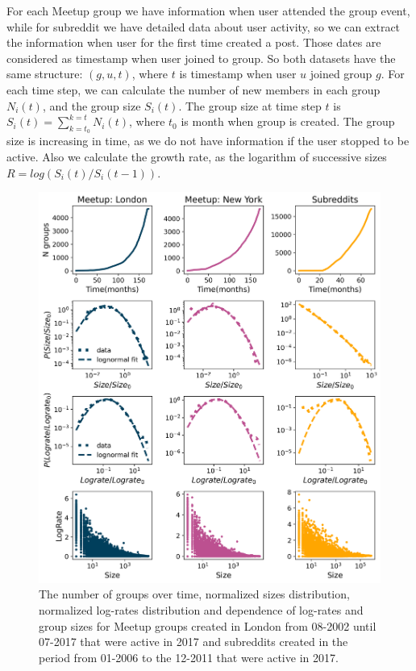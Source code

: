 For each Meetup group we have information when user attended the group event, while for subreddit we have detailed data about user activity, so we can extract the information when user for the first time created a post. Those dates are considered as timestamp when user joined to group. So both datasets have the same structure: $(g, u, t)$, where $t$ is timestamp when user $u$ joined group $g$. For each time step, we can calculate the number of new members in each group $N_i(t)$, and the group size $S_{i}(t)$. The group size at time step $t$ is $S_{i}(t)=\sum^{k=t}_{k=t_{0}}N_{i}(t)$, where $t_0$ is month when group is created. The group size is increasing in time, as we do not have information if the user stopped to be active. Also we calculate the growth rate, as the logarithm of successive sizes $R = log(S_{i}(t)/S_{i}(t-1))$.

\begin{figure}[h]
	\centering
	\includegraphics[width=0.8\linewidth]{Figures/figures/Fig2.png}
	\caption[Properties of Meetup and Subreddit groups]{The number of groups over time, normalized sizes distribution, normalized log-rates distribution and dependence of log-rates and group sizes for Meetup groups created in London from 08-2002 until 07-2017 that were active in 2017 and subreddits created in the period from 01-2006 to the  12-2011 that were active in 2017. }
	\label{fig:data1}
\end{figure}   

